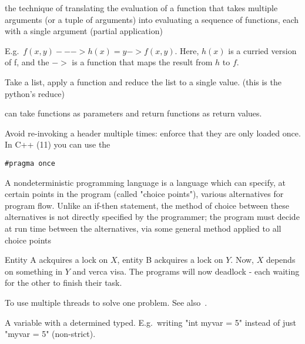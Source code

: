 \begin{definition}[Currying]
    the technique of translating the evaluation of a function that takes
    multiple arguments (or a tuple of arguments) into evaluating a sequence of
    functions, each with a single argument (partial application)

    E.g.\ $f(x,y) ---> h(x) = y -> f(x, y)$.
    Here, $h(x)$ is a curried version of f, and the $->$ is a function that
    maps the result from $h$ to $f$.
\end{definition}

\begin{definition}[Folding]
    Take a list, apply a function and reduce the list to a single value.
    (this is the python's reduce)

\end{definition}

\begin{definition}
    can take functions as parameters and return functions as return values.

\end{definition}

\begin{definition}
    Avoid re-invoking a header multiple times: enforce that they are only 
    loaded once. In C++ (11) you can use the 
    \begin{verbatim}#pragma once\end{verbatim}
\end{definition}

\begin{definition}\label{nondeterministicprog}
    A nondeterministic programming language is a language which can specify, at
    certain points in the program (called "choice points"), various alternatives
    for program flow. Unlike an if-then statement, the method of choice between
    these alternatives is not directly specified by the programmer; the program
    must decide at run time between the alternatives, via some general method
    applied to all choice points

\end{definition}

\begin{definition}
    Entity A ackquires a lock on $X$, entity B ackquires a lock on $Y$.
    Now, $X$ depends on something in $Y$ and verca visa. The programs will
    now deadlock - each waiting for the other to finish their task.

\end{definition}

\begin{definition}[Parallelism]\label{parallelism}
    To use multiple threads to solve one problem. See
    also~.

\end{definition}

\begin{definition}
    A variable with a determined typed. E.g.\ writing "int myvar = 5" instead
    of just "myvar = 5" (non-strict).

\end{definition}
